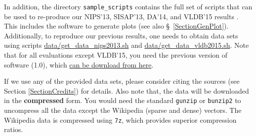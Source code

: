 \documentclass[runningheads,a4paper]{llncs}
\newcommand{\replocfile}{https://github.com/searchivarius/NonMetricSpaceLib/blob/pserv/}
\newcommand{\ttt}[1]{\texttt{#1}}
\begin{document}
In addition, the directory \ttt{sample\_scripts} contains the full set of scripts that can be used to re-produce our NIPS'13, SISAP'13, DA'14, and VLDB'15 results \cite{Boytsov_and_Bilegsaikhan:sisap2013,Boytsov_and_Bilegsaikhan:nips2013,ponomarenko2014comparative,naidan2015permutation}.
This includes the software to generate plots (see also \S~\ref{SectionGenPlot}). 
Additionally, to reproduce our previous results, one needs to obtain data sets using scripts
\href{\replocfile data/get_data_nips2013.sh}{data/get\_data\_nips2013.sh} 
and \href{\replocfile data/get_data_vldb2015.sh}{data/get\_data\_vldb2015.sh}. 
Note that for all evaluations except VLDB'15, you need the previous version of software (1.0),
which \href{https://github.com/searchivarius/NonMetricSpaceLib/releases}{can be download from here}.




If we use any of the provided data sets, please consider citing the sources (see Section \ref{SectionCredits}) for details.
Also note that, the data will be downloaded in the \textbf{compressed} form.
You would need the standard \ttt{gunzip} or \ttt{bunzip2} to uncompress all the data except
the Wikipedia (sparse and dense) vectors.
The Wikipedia data is compressed using \ttt{7z}, which provides 
superior compression ratios.
\end{document}
